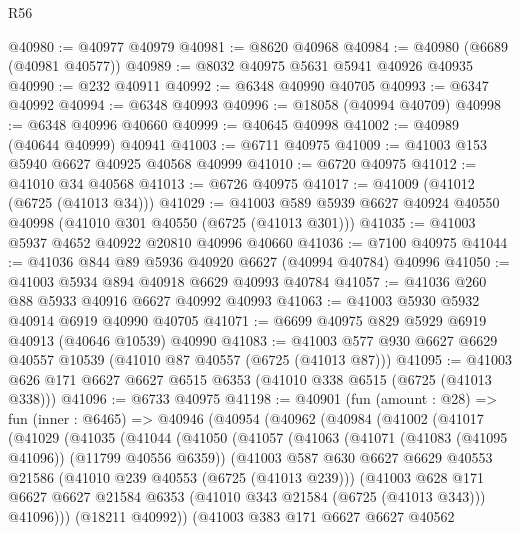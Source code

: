 \begin{lexlean}{R56}
\begin{coremodule}
@40980 := @40977 @40979
@40981 := @8620 @40968
@40984 := @40980 (@6689 (@40981 @40577))
@40989 := @8032 @40975 @5631 @5941 @40926 @40935
@40990 := @232 @40911
@40992 := @6348 @40990 @40705
@40993 := @6347 @40992
@40994 := @6348 @40993
@40996 := @18058 (@40994 @40709)
@40998 := @6348 @40996 @40660
@40999 := @40645 @40998
@41002 := @40989 (@40644 @40999) @40941
@41003 := @6711 @40975
@41009 := @41003 @153 @5940 @6627 @40925 @40568 @40999
@41010 := @6720 @40975
@41012 := @41010 @34 @40568
@41013 := @6726 @40975
@41017 := @41009 (@41012 (@6725 (@41013 @34)))
@41029 := @41003 @589 @5939 @6627 @40924 @40550 @40998 (@41010 @301 @40550 (@6725 (@41013 @301)))
@41035 := @41003 @5937 @4652 @40922 @20810 @40996 @40660
@41036 := @7100 @40975
@41044 := @41036 @844 @89 @5936 @40920 @6627 (@40994 @40784) @40996
@41050 := @41003 @5934 @894 @40918 @6629 @40993 @40784
@41057 := @41036 @260 @88 @5933 @40916 @6627 @40992 @40993
@41063 := @41003 @5930 @5932 @40914 @6919 @40990 @40705
@41071 := @6699 @40975 @829 @5929 @6919 @40913 (@40646 @10539) @40990
@41083 := @41003 @577 @930 @6627 @6629 @40557 @10539 (@41010 @87 @40557 (@6725 (@41013 @87)))
@41095 := @41003 @626 @171 @6627 @6627 @6515 @6353 (@41010 @338 @6515 (@6725 (@41013 @338)))
@41096 := @6733 @40975
@41198 := @40901
    (fun (amount : @28) =>
    fun (inner : @6465) =>
    @40946
      (@40954
        (@40962
          (@40984
            (@41002
              (@41017
                (@41029
                  (@41035
                    (@41044
                      (@41050
                        (@41057
                          (@41063
                            (@41071 (@41083 (@41095 @41096)) (@11799 @40556 @6359))
                            (@41003
                              @587
                              @630
                              @6627
                              @6629
                              @40553
                              @21586
                              (@41010 @239 @40553 (@6725 (@41013 @239)))
                              (@41003
                                @628
                                @171
                                @6627
                                @6627
                                @21584
                                @6353
                                (@41010 @343 @21584 (@6725 (@41013 @343)))
                                @41096)))
                          (@18211 @40992))
                        (@41003
                          @383
                          @171
                          @6627
                          @6627
                          @40562

\end{coremodule}
\end{lexlean}

